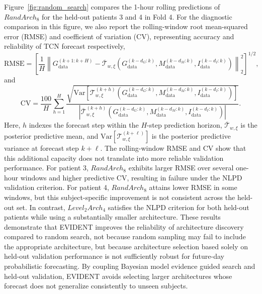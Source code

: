 \documentclass[preprint,12pt]{elsarticle}
\begin{document}
Figure~\ref{fig:random_search} compares the 1-hour rolling predictions of $RandArch_8$ for the held-out patients 3 and 4 in Fold 4.
%
For the diagnostic comparison in this figure, we also report the rolling-window root mean-squared error (RMSE) and coefficient of variation (CV), representing accuracy and reliability of TCN forecast respectively,
%
\begin{equation}
\mathrm{RMSE}
=
\left[
\frac{1}{H}
\left\|
G_{\mathrm{data}}^{(k+1:k+H)}
-
\overline{\mathcal{T}}_{w,\xi}\!\left(
G_{\mathrm{data}}^{(k-d_G:k)},
M_{\mathrm{data}}^{(k-d_M:k)},
I_{\mathrm{data}}^{(k-d_I:k)}
\right)
\right\|_2^2
\right]^{1/2},
\label{eq:rmse}
\end{equation}
%
and
%
\begin{equation}
\mathrm{CV}
=
\frac{100}{H}
\sum_{h=1}^{H}
\frac{
\sqrt{
\mathrm{Var}\!\left[
\mathcal{T}_{w,\xi}^{(k+h)}\!\left(
G_{\mathrm{data}}^{(k-d_G:k)},
M_{\mathrm{data}}^{(k-d_M:k)},
I_{\mathrm{data}}^{(k-d_I:k)}
\right)
\right]
}
}{
\left|
\overline{\mathcal{T}}_{w,\xi}^{(k+h)}\!\left(
G_{\mathrm{data}}^{(k-d_G:k)},
M_{\mathrm{data}}^{(k-d_M:k)},
I_{\mathrm{data}}^{(k-d_I:k)}
\right)
\right|
}.
\label{eq:cv}
\end{equation}
%
Here, $h$ indexes the forecast step within the $H$-step prediction horizon, $\overline{\mathcal{T}}_{w,\xi}$ is the posterior predictive mean, and $\mathrm{Var}[\mathcal{T}_{w,\xi}^{(k+\ell)}]$ is the posterior predictive variance at forecast step $k+\ell$.
%
The rolling-window RMSE and CV show that this additional capacity does not translate into more reliable validation performance. 
For patient 3, $RandArch_8$ exhibits larger RMSE over several one-hour windows and higher predictive CV, resulting in failure under the NLPD validation criterion. For patient 4, $RandArch_8$ attains lower RMSE in some windows, but this subject-specific improvement is not consistent across the held-out set. In contrast, $Level_2Arch_4$ satisfies the NLPD criterion for both held-out patients while using a substantially smaller architecture. 
%
%
These results demonstrate that EVIDENT improves the reliability of architecture discovery compared to random search, not because random sampling may fail to include the appropriate architecture, but because architecture selection based solely on held-out validation performance is not sufficiently robust for future-day probabilistic forecasting. By coupling Bayesian model evidence guided search and held-out validation, EVIDENT avoids selecting larger architectures whose forecast does not generalize consistently to unseen subjects.
\end{document}
